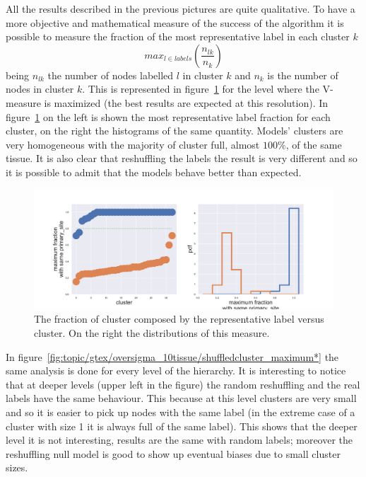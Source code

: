 All the results described in the previous pictures are quite qualitative. To have a more objective and mathematical measure of the success of the algorithm it is possible to measure the fraction of the most representative label in each cluster $k$
\[
max_{l\in labels}\left(\frac{n_{l k}}{n_k}\right)
\]
being $n_{l k}$ the number of nodes labelled $l$ in cluster $k$ and $n_k$ is the number of nodes in cluster $k$. This is represented in figure~\ref{fig:gtex/oversigma_10tissue/shuffledcluster_maximum_l2_primary_site} for the level where the V-measure is maximized (the best results are expected at this resolution). In figure~\ref{fig:gtex/oversigma_10tissue/shuffledcluster_maximum_l2_primary_site} on the left is shown the most representative label fraction for each cluster, on the right the histograms of the same quantity. Models' clusters are very homogeneous with the majority of cluster full, almost $100\%$, of the same tissue. It is also clear that reshuffling the labels the result is very different and so it is possible to admit that the models behave better than expected. 
\begin{figure}[htb!]
    \centering
    \includegraphics[width=0.9\linewidth]{pictures/topic/gtex/oversigma_10tissue/shuffledcluster_maximum_l2_primary_site.pdf}
    \caption{The fraction of cluster composed by the representative label versus cluster. On the right the distributions of this measure.}
    \label{fig:gtex/oversigma_10tissue/shuffledcluster_maximum_l2_primary_site}
\end{figure}
In figure~\ref{fig:topic/gtex/oversigma_10tissue/shuffledcluster_maximum*} the same analysis is done for every level of the hierarchy. It is interesting to notice that at deeper levels (upper left in the figure) the random reshuffling and the real labels have the same behaviour. This because at this level clusters are very small and so it is easier to pick up nodes with the same label (in the extreme case of a cluster with size 1 it is always full of the same label). This shows that the deeper level it is not interesting, results are the same with random labels; moreover the reshuffling null model is good to show up eventual biases due to small cluster sizes.
